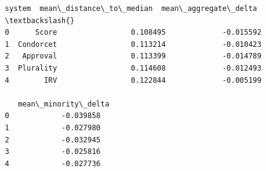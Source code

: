 \documentclass[11pt]{article}
\makeatletter
\newcommand{\boxspacing}{\kern\kvtcb@left@rule\kern\kvtcb@boxsep}
\newcommand{\prompt}[4]{
        {\ttfamily\llap{{\color{#2}[#3]:\hspace{3pt}#4}}\vspace{-\baselineskip}}
    }
\makeatother
\begin{document}
            \begin{tcolorbox}[breakable, size=fbox, boxrule=.5pt, pad at break*=1mm, opacityfill=0]
\prompt{Out}{outcolor}{29}{\boxspacing}
\begin{Verbatim}[commandchars=\\\{\}]
      system  mean\_distance\_to\_median  mean\_aggregate\_delta  \textbackslash{}
0      Score                 0.108495             -0.015592
1  Condorcet                 0.113214             -0.010423
2   Approval                 0.113399             -0.014789
3  Plurality                 0.114608             -0.012493
4        IRV                 0.122844             -0.005199

   mean\_minority\_delta
0            -0.039858
1            -0.027980
2            -0.032945
3            -0.025816
4            -0.027736
\end{Verbatim}
\end{tcolorbox}
        
\end{document}
